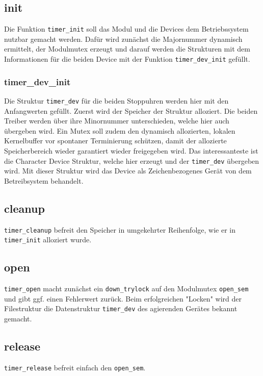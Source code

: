 \documentclass[
   draft=false
  ,paper=a4
  ,twoside=false
  ,fontsize=11pt
  ,headsepline
  ,BCOR10mm
  ,DIV11
  ,parskip=full+
]{scrartcl} %
\begin{document}
\subsection{init}
Die Funktion \texttt{timer\_init} soll das Modul und die Devices dem 
Betriebssystem nutzbar gemacht werden. Dafür wird zunächst die Majornummer 
dynamisch ermittelt, der Modulmutex erzeugt und darauf werden die Strukturen 
mit dem Informationen für die beiden Device mit der Funktion 
\texttt{timer\_dev\_init} gefüllt.

\subsubsection{timer\_dev\_init}
Die Struktur \texttt{timer\_dev} für die beiden Stoppuhren werden hier mit 
den Anfangwerten gefüllt. Zuerst wird der Speicher der Struktur alloziert.
Die beiden Treiber werden über ihre Minornummer unterschieden, welche hier 
auch übergeben wird. Ein Mutex soll zudem den dynamisch allozierten, lokalen
Kernelbuffer vor spontaner Terminierung schützen, damit der allozierte 
Speicherbereich wieder garantiert wieder freigegeben wird.
Das interessanteste ist die Character Device Struktur, welche hier erzeugt 
und der \texttt{timer\_dev} übergeben wird. Mit dieser Struktur wird das 
Device als Zeichenbezogenes Gerät von dem Betreibsystem behandelt.


\subsection{cleanup}
\texttt{timer\_cleanup} befreit den Speicher in umgekehrter Reihenfolge, wie 
er in \texttt{timer\_init} alloziert wurde.

\subsection{open}
\texttt{timer\_open} macht zunächst ein \texttt{down\_trylock} auf den 
Modulmutex \texttt{open\_sem} und gibt ggf. einen Fehlerwert zurück. Beim 
erfolgreichen "{}Locken"{} wird der Filestruktur die Datenstruktur 
\texttt{timer\_dev} des agierenden Gerätes bekannt gemacht. 

\subsection{release}
\texttt{timer\_release} befreit einfach den \texttt{open\_sem}.
\end{document}

